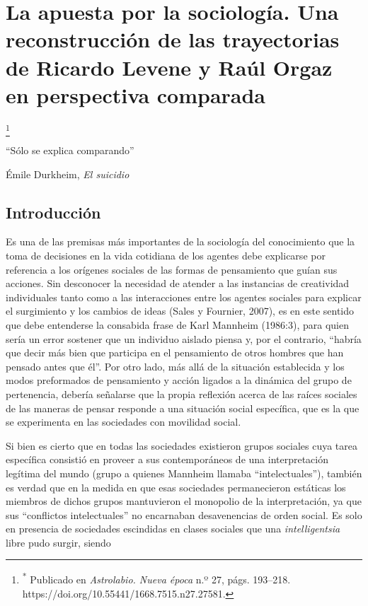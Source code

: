 \mainmatter

\chapter{La apuesta por la sociología. Una reconstrucción de las trayectorias de Ricardo Levene y Raúl Orgaz en perspectiva comparada}

\footnote{\textsuperscript{*} Publicado en \emph{Astrolabio. Nueva época} n.º 27, págs. 193--218. https://doi.org/10.55441/1668.7515.n27.27581.}

\enquote{Sólo se explica comparando}

Émile Durkheim, \emph{El suicidio}

\section{Introducción}

Es una de las premisas más importantes de la sociología del conocimiento que la toma de decisiones en la vida cotidiana de los agentes debe explicarse por referencia a los orígenes sociales de las formas de pensamiento que guían sus acciones. Sin desconocer la necesidad de atender a las instancias de creatividad individuales tanto como a las interacciones entre los agentes sociales para explicar el surgimiento y los cambios de ideas (Sales y Fournier, 2007), es en este sentido que debe entenderse la consabida frase de Karl Mannheim (1986:3), para quien sería un error sostener que un individuo aislado piensa y, por el contrario, \enquote{habría que decir más bien que participa en el pensamiento de otros hombres que han pensado antes que él}. Por otro lado, más allá de la situación establecida y los modos preformados de pensamiento y acción ligados a la dinámica del grupo de pertenencia, debería señalarse que la propia reflexión acerca de las raíces sociales de las maneras de pensar responde a una situación social específica, que es la que se experimenta en las sociedades con movilidad social.

Si bien es cierto que en todas las sociedades existieron grupos sociales cuya tarea específica consistió en proveer a sus contemporáneos de una interpretación legítima del mundo (grupo a quienes Mannheim llamaba \enquote{intelectuales}), también es verdad que en la medida en que esas sociedades permanecieron estáticas los miembros de dichos grupos mantuvieron el monopolio de la interpretación, ya que sus \enquote{conflictos intelectuales} no encarnaban desavenencias de orden social. Es solo en presencia de sociedades escindidas en clases sociales que una \emph{intelligentsia} libre pudo surgir, siendo

